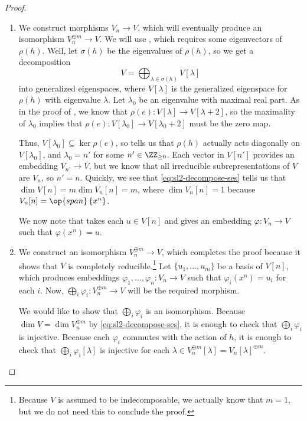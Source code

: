 \documentclass[../notes.tex]{subfiles}
\begin{document}
\begin{proof}
\begin{enumerate}
		\item We construct morphisms $V_n\to V$, which will eventually produce an isomorphism $V_n^{\oplus m}\to V$. We will use , which requires some eigenvectors of $\rho(h)$. Well, let $\sigma(h)$ be the eigenvalues of $\rho(h)$, so we get a decomposition
		\[V=\bigoplus_{\lambda\in\sigma(h)}V[\lambda]\]
		into generalized eigenspaces, where $V[\lambda]$ is the generalized eigenspace for $\rho(h)$ with eigenvalue $\lambda$. Let $\lambda_0$ be an eigenvalue with maximal real part. As in the proof of , we know that $\rho(e)\colon V[\lambda]\to V[\lambda+2]$, so the maximality of $\lambda_0$ implies that $\rho(e)\colon V[\lambda_0]\to V[\lambda_0+2]$ must be the zero map.
		
		Thus, $V[\lambda_0]\subseteq\ker\rho(e)$, so  tells us that $\rho(h)$ actually acts diagonally on $V[\lambda_0]$, and $\lambda_0=n'$ for some $n'\in\ZZ_{\ge0}$. Each vector in $V[n']$ provides an embedding $V_{n'}\to V$, but we know that all irreducible subrepresentations of $V$ are $V_n$, so $n'=n$. Quickly, we see that \eqref{eq:sl2-decompose-ses} tells us that $\dim V[n]=m\dim V_n[n]=m$, where $\dim V_n[n]=1$ because $V_n[n]=\op{span}\left\{x^n\right\}$.

		We now note that  takes each $u\in V[n]$ and gives an embedding $\varphi\colon V_n\to V$ such that $\varphi\left(x^n\right)=u$.

		\item We construct an isomorphism $V_n^{\oplus m}\to V$, which completes the proof because it shows that $V$ is completely reducible.\footnote{Because $V$ is assumed to be indecomposable, we actually know that $m=1$, but we do not need this to conclude the proof.} Let $\{u_1,\ldots,u_m\}$ be a basis of $V[n]$, which produces embeddings $\varphi_1,\ldots,\varphi_n\colon V_n\to V$ such that $\varphi_i\left(x^n\right)=u_i$ for each $i$. Now, $\bigoplus_i\varphi_i\colon V_n^{\oplus m}\to V$ will be the required morphism.

		We would like to show that $\bigoplus_i\varphi_i$ is an isomorphism. Because $\dim V=\dim V_n^{\oplus m}$ by \eqref{eq:sl2-decompose-ses}, it is enough to check that $\bigoplus_i\varphi_i$ is injective. Because each $\varphi_i$ commutes with the action of $h$, it is enough to check that $\bigoplus_i\varphi_i[\lambda]$ is injective for each $\lambda\in V_n^{\oplus m}[\lambda]=V_n[\lambda]^{\oplus m}$.
		

\end{enumerate}
\end{proof}
\end{document}
